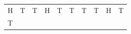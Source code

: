 {\begin{tabular}[t]{|l|l|l|l|l|l|l|l|l|l|}
     \tabularnewline\cline{1-1}\cline{2-2}\cline{3-3}\cline{4-4}\cline{5-5}\cline{6-6}\cline{7-7}\cline{8-8}\cline{9-9}\cline{10-10}
        H &
        T &
        T &
        H &
        T &
        T &
        T &
        T &
        H &
        T%
     \tabularnewline\cline{1-1}\cline{2-2}\cline{3-3}\cline{4-4}\cline{5-5}\cline{6-6}\cline{7-7}\cline{8-8}\cline{9-9}\cline{10-10}
        T &

\end{tabular}}

